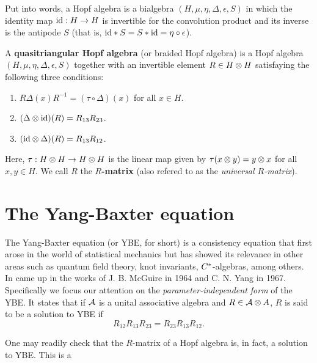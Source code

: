 Put into words, a Hopf algebra is a bialgebra $(H,\mu,\eta,\Delta,\epsilon,S)$ in which the identity map $\mathrm{id}:H\to H$ is invertible for the convolution product and its inverse is the antipode $S$ (that is, $\mathrm{id}*S = S*\mathrm{id} = \eta\circ\epsilon$).

\begin{definition}
    A \textbf{quasitriangular Hopf algebra} (or braided Hopf algebra) is a Hopf algebra $(H,\mu,\eta,\Delta,\epsilon,S)$ together with an invertible element $R\in H\otimes H$ satisfaying the following three conditions:
    \begin{enumerate}
        \item $R\Delta(x)R^{-1} = (\tau \circ \Delta)(x)$ for all $x\in H$.
        \item $(\Delta\otimes\mathrm{id})(R)=R_{13}R_{23}$.
        \item $(\mathrm{id}\otimes\Delta)(R)=R_{13}R_{12}$.
    \end{enumerate}
    Here, $\tau: H \otimes H \to H \otimes H$ is the linear map given by $\tau(x \otimes y) = y \otimes x$ for all $x,y \in H$. We call $R$ the \textbf{$R$-matrix} (also refered to as the \emph{universal $R$-matrix}).
\end{definition}

\section{The Yang-Baxter equation}

The Yang-Baxter equation (or YBE, for short) is a consistency equation that first arose in the world of statistical mechanics but has showed its relevance in other areas such as quantum field theory, knot invariants, $C^{*}$-algebras, among others. In came up in the works of J. B. McGuire in 1964 and C. N. Yang in 1967. Specifically we focus our attention on the \emph{parameter-independent form} of the YBE. It states that if $\mathcal{A}$ is a unital associative algebra and $R \in \mathcal{A}\otimes A$, $R$ is said to be a solution to YBE if
\begin{equation}    
    R_{12}R_{13}R_{23} = R_{23}R_{13}R_{12}.
\end{equation}

One may readily check that the $R$-matrix of a Hopf algebra is, in fact, a solution to YBE. This is a 